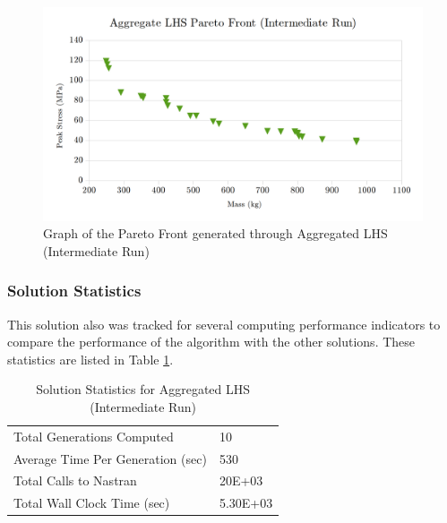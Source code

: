 \begin{figure}[!htbp]
\includegraphics[width=\textwidth]{img/pf_agg_int.png}
\caption{Graph of the Pareto Front generated through Aggregated LHS (Intermediate Run)}
\label{fig:pfront_agg_int}
\end{figure}

\subsubsection{Solution Statistics}
This solution also was tracked for several computing performance indicators to compare the performance of the algorithm with the other solutions. These statistics are listed in Table \ref{tab:stat_agg_int}. 

\begin{table}[!htbp]
  \centering
\caption{Solution Statistics for Aggregated LHS (Intermediate Run)}
  \label{tab:stat_agg_int}
  \begin{tabular}{|l|l|}
    \hline
	  Total Generations Computed & 10\\
    Average Time Per Generation (sec) & 530\\
    Total Calls to Nastran & 20E+03\\
    Total Wall Clock Time (sec)	 & 5.30E+03\\
    \hline
  \end{tabular}
\end{table} 

